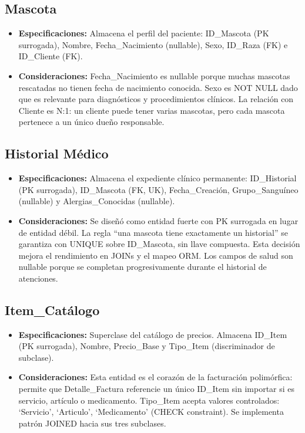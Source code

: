 \subsection{Mascota}

\begin{itemize}
	\item \textbf{Especificaciones:} Almacena el perfil del paciente: ID\_Mascota (PK surrogada), Nombre, Fecha\_Nacimiento (nullable), Sexo, ID\_Raza (FK) e ID\_Cliente (FK).
	\item \textbf{Consideraciones:} Fecha\_Nacimiento es nullable porque muchas mascotas rescatadas no tienen fecha de nacimiento conocida. Sexo es NOT NULL dado que es relevante para diagnósticos y procedimientos clínicos. La relación con Cliente es N:1: un cliente puede tener varias mascotas, pero cada mascota pertenece a un único dueño responsable.
\end{itemize}

\subsection{Historial Médico}

\begin{itemize}
	\item \textbf{Especificaciones:} Almacena el expediente clínico permanente: ID\_Historial (PK surrogada), ID\_Mascota (FK, UK), Fecha\_Creación, Grupo\_Sanguíneo (nullable) y Alergias\_Conocidas (nullable).
	\item \textbf{Consideraciones:} Se diseñó como entidad fuerte con PK surrogada en lugar de entidad débil. La regla ``una mascota tiene exactamente un historial'' se garantiza con UNIQUE sobre ID\_Mascota, sin llave compuesta. Esta decisión mejora el rendimiento en JOINs y el mapeo ORM. Los campos de salud son nullable porque se completan progresivamente durante el historial de atenciones.
\end{itemize}

\subsection{Item\_Catálogo}

\begin{itemize}
	\item \textbf{Especificaciones:} Superclase del catálogo de precios. Almacena ID\_Item (PK surrogada), Nombre, Precio\_Base y Tipo\_Item (discriminador de subclase).
	\item \textbf{Consideraciones:} Esta entidad es el corazón de la facturación polimórfica: permite que Detalle\_Factura referencie un único ID\_Item sin importar si es servicio, artículo o medicamento. Tipo\_Item acepta valores controlados: `Servicio', `Articulo', `Medicamento' (CHECK constraint). Se implementa patrón JOINED hacia sus tres subclases.
\end{itemize}

